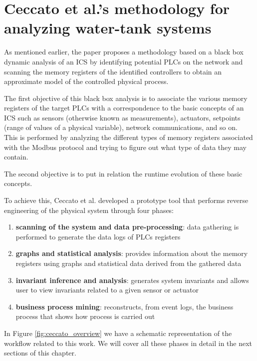\section{Ceccato et al.’s methodology for analyzing water-tank systems}
\label{sec:ceccato_metodology}
As mentioned earlier, the paper proposes a methodology based on a black box dynamic analysis of an ICS by identifying potential PLCs on the network and scanning the memory registers of the identified controllers to obtain an approximate model of the controlled physical process.

\bigskip
The first objective of this black box analysis is to associate the various memory registers of the target PLCs with a correspondence to the basic concepts of an ICS such as sensors (otherwise known as measurements), actuators, setpoints (range of values of a physical variable), network communications, and so on.\\
This is performed by analyzing the different types of memory registers associated with the Modbus protocol and trying to figure out what type of data they may contain.

The second objective is to put in relation the runtime evolution of these basic concepts.

\bigskip
To achieve this, Ceccato et al. developed a prototype tool \cite{plc_re} that performs reverse engineering of the physical system through four phases:

\begin{enumerate}
	\item \textbf{scanning of the system and data pre-processing}: data gathering is performed to generate the data logs of PLCs registers
	\item \textbf{graphs and statistical analysis}: provides information about the memory registers using graphs and statistical data derived from the gathered data
	\item \textbf{invariant inference and analysis}: generates system invariants and allows user to view invariants related to a given sensor or actuator
	\item \textbf{business process mining}: reconstructs, from event logs, the business process that shows how process is carried out
\end{enumerate}

In Figure \ref{fig:ceccato_overview} we have a schematic representation of the workflow related to this work. We will cover all these phases in detail in the next sections of this chapter. 

